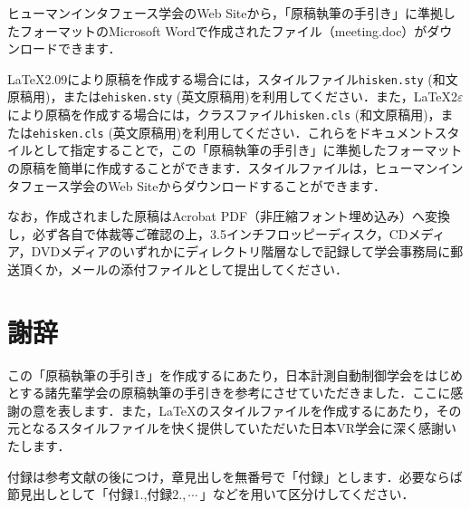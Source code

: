 \documentclass{hisken}
\begin{document}
ヒューマンインタフェース学会のWeb Siteから，「原稿執筆の手引き」に準拠したフォーマットのMicrosoft Wordで作成されたファイル（meeting.doc）がダウンロードできます．

\LaTeX2.09{}\cite{tex1,tex2}により原稿を作成する場合には，スタイルファイル{\tt hisken.sty} (和文原稿用)，または{\tt ehisken.sty} (英文原稿用)を利用してください．また，\LaTeX{}2$\varepsilon$\cite{tex3}により原稿を作成する場合には，クラスファイル{\tt hisken.cls} (和文原稿用)，または{\tt ehisken.cls} (英文原稿用)を利用してください．これらをドキュメントスタイルとして指定することで，この「原稿執筆の手引き」に準拠したフォーマットの原稿を簡単に作成することができます．スタイルファイルは，ヒューマンインタフェース学会のWeb Siteからダウンロードすることができます．

なお，作成されました原稿はAcrobat PDF（非圧縮フォント埋め込み）へ変換し，必ず各自で体裁等ご確認の上，3.5インチフロッピーディスク，CDメディア，DVDメディアのいずれかにディレクトリ階層なしで記録して学会事務局に郵送頂くか，メールの添付ファイルとして提出してください．


\section*{謝辞}
この「原稿執筆の手引き」を作成するにあたり，日本計測自動制御学会をはじめとする諸先輩学会の原稿執筆の手引きを参考にさせていただきました．ここに感謝の意を表します．また，\LaTeX{}のスタイルファイルを作成するにあたり，その元となるスタイルファイルを快く提供していただいた日本VR学会に深く感謝いたします．


%


\appendix{}
付録は参考文献の後につけ，章見出しを無番号で「付録」とします．必要ならば節見出しとして「付録1.,付録2.,\,$ \cdots $\,」などを用いて区分けしてください．
\end{document}
